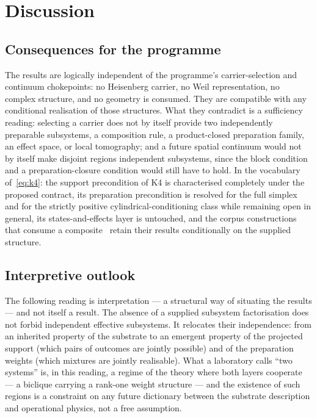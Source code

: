 \documentclass[11pt,a4paper]{article}
\begin{document}
  \section{Discussion}
  \label{sec:discussion}

  \subsection{Consequences for the programme}
    \label{ssec:consequences}

    The results are logically independent of the programme's carrier-selection and continuum chokepoints:
    no Heisenberg carrier, no Weil representation, no complex structure, and no geometry is consumed.
    They are compatible with any conditional realisation of those structures.
    What they contradict is a sufficiency reading: selecting a carrier does not by itself provide two
    independently preparable subsystems, a composition rule, a product-closed preparation family, an effect
    space, or local tomography; and a future spatial continuum would not by itself make disjoint regions
    independent subsystems, since the block condition and a preparation-closure condition would still have
    to hold.
    In the vocabulary of~\eqref{eq:k4}: the support precondition of K4 is characterised completely under
    the proposed contract, its preparation precondition is resolved for the full simplex and for the
    strictly positive cylindrical-conditioning class while remaining open in general, its
    states-and-effects layer is untouched, and the corpus constructions that consume a
    composite~\cite{Beau2026q3,Beau2026entnote} retain their results conditionally on the supplied
    structure.

  \subsection{Interpretive outlook}
    \label{ssec:outlook}

    The following reading is interpretation --- a structural way of situating the results --- and not itself
    a result.
    The absence of a supplied subsystem factorisation does not forbid independent effective subsystems.
    It relocates their independence: from an inherited property of the substrate to an emergent property of
    the projected support (which pairs of outcomes are jointly possible) and of the preparation weights
    (which mixtures are jointly realisable).
    What a laboratory calls ``two systems'' is, in this reading, a regime of the theory where both layers
    cooperate --- a biclique carrying a rank-one weight structure --- and the existence of such regions is a
    constraint on any future dictionary between the substrate description and operational physics, not a
    free assumption.
\end{document}
